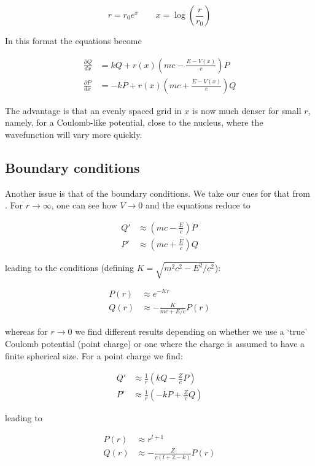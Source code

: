 \documentclass[]{report}
\begin{document}
\begin{equation}
r = r_0e^x \qquad x = \log\left(\frac{r}{r_0}\right)
\end{equation}

In this format the equations become

\begin{align}\label{dirac_sys_log}
\frac{\partial Q}{dx} &= kQ + r(x)\left(mc-\frac{E-V(x)}{c}\right)P \\
\frac{\partial P}{dx} &= -kP + r(x)\left(mc+\frac{E-V(x)}{c}\right)Q
\end{align}

The advantage is that an evenly spaced grid in $x$ is now much denser for small $r$, namely, for a Coulomb-like potential, close to the nucleus, where the wavefunction will vary more quickly.

\subsection{Boundary conditions}
Another issue is that of the boundary conditions. We take our cues for that from \cite{silbar2010}. For $r \rightarrow \infty$, one can see how $V \rightarrow 0$ and the equations reduce to

\begin{align}\label{dirac_sys_inf}
Q' &\approx \left(mc-\frac{E}{c}\right)P \\
P' &\approx \left(mc+\frac{E}{c}\right)Q
\end{align}

leading to the conditions (defining $K = \sqrt{m^2c^2-E^2/c^2}$):

\begin{align}
P(r) &\approx e^{-Kr} \\
Q(r) &\approx -\frac{K}{mc+E/c}P(r)
\end{align}

whereas for $r \rightarrow 0$ we find different results depending on whether we use a `true' Coulomb potential (point charge) or one where the charge is assumed to have a finite spherical size. For a point charge we find:

\begin{align}\label{dirac_sys_zero_pc}
	Q' &\approx \frac{1}{r}\left(kQ- \frac{Z}{c}P\right)  \\
	P' &\approx \frac{1}{r}\left(-kP + \frac{Z}{c}Q\right)
\end{align}

leading to

\begin{align}
P(r) &\approx r^{l+1} \\
Q(r) &\approx -\frac{Z}{c(l+2-k)}P(r)
\end{align}
\end{document}
